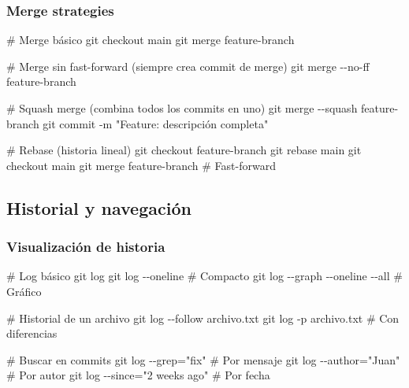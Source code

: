 \documentclass[
  11pt,
  letterpaper,
  oneside,
  openany]{scrbook}
\newenvironment{Shaded}{}{}
\newcommand{\AttributeTok}[1]{\textcolor[rgb]{0.84,0.23,0.29}{#1}}
\newcommand{\CommentTok}[1]{\textcolor[rgb]{0.42,0.45,0.49}{#1}}
\newcommand{\FunctionTok}[1]{\textcolor[rgb]{0.44,0.26,0.76}{#1}}
\newcommand{\NormalTok}[1]{\textcolor[rgb]{0.14,0.16,0.18}{#1}}
\newcommand{\OperatorTok}[1]{\textcolor[rgb]{0.14,0.16,0.18}{#1}}
\newcommand{\StringTok}[1]{\textcolor[rgb]{0.01,0.18,0.38}{#1}}
\begin{document}
\subsubsection{Merge strategies}\label{merge-strategies}

\begin{Shaded}
\begin{Highlighting}[]
\CommentTok{\# Merge básico}
\FunctionTok{git}\NormalTok{ checkout main}
\FunctionTok{git}\NormalTok{ merge feature{-}branch}

\CommentTok{\# Merge sin fast{-}forward (siempre crea commit de merge)}
\FunctionTok{git}\NormalTok{ merge }\AttributeTok{{-}{-}no{-}ff}\NormalTok{ feature{-}branch}

\CommentTok{\# Squash merge (combina todos los commits en uno)}
\FunctionTok{git}\NormalTok{ merge }\AttributeTok{{-}{-}squash}\NormalTok{ feature{-}branch}
\FunctionTok{git}\NormalTok{ commit }\AttributeTok{{-}m} \StringTok{"Feature: descripción completa"}

\CommentTok{\# Rebase (historia lineal)}
\FunctionTok{git}\NormalTok{ checkout feature{-}branch}
\FunctionTok{git}\NormalTok{ rebase main}
\FunctionTok{git}\NormalTok{ checkout main}
\FunctionTok{git}\NormalTok{ merge feature{-}branch  }\CommentTok{\# Fast{-}forward}
\end{Highlighting}
\end{Shaded}

\subsection{Historial y navegación}\label{historial-y-navegaciuxf3n}

\subsubsection{Visualización de
historia}\label{visualizaciuxf3n-de-historia}

\begin{Shaded}
\begin{Highlighting}[]
\CommentTok{\# Log básico}
\FunctionTok{git}\NormalTok{ log}
\FunctionTok{git}\NormalTok{ log }\AttributeTok{{-}{-}oneline}  \CommentTok{\# Compacto}
\FunctionTok{git}\NormalTok{ log }\AttributeTok{{-}{-}graph} \AttributeTok{{-}{-}oneline} \AttributeTok{{-}{-}all}  \CommentTok{\# Gráfico}

\CommentTok{\# Historial de un archivo}
\FunctionTok{git}\NormalTok{ log }\AttributeTok{{-}{-}follow}\NormalTok{ archivo.txt}
\FunctionTok{git}\NormalTok{ log }\AttributeTok{{-}p}\NormalTok{ archivo.txt  }\CommentTok{\# Con diferencias}

\CommentTok{\# Buscar en commits}
\FunctionTok{git}\NormalTok{ log }\AttributeTok{{-}{-}grep}\OperatorTok{=}\StringTok{"fix"}  \CommentTok{\# Por mensaje}
\FunctionTok{git}\NormalTok{ log }\AttributeTok{{-}{-}author}\OperatorTok{=}\StringTok{"Juan"}  \CommentTok{\# Por autor}
\FunctionTok{git}\NormalTok{ log }\AttributeTok{{-}{-}since}\OperatorTok{=}\StringTok{"2 weeks ago"}  \CommentTok{\# Por fecha}
\end{Highlighting}
\end{Shaded}
\end{document}

